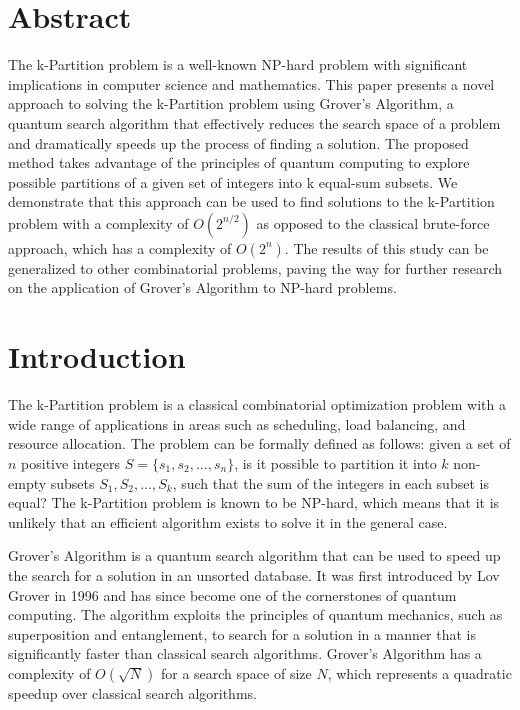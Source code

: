 \section{Abstract}

The k-Partition problem is a well-known NP-hard problem with significant implications in computer science and mathematics. This paper presents a novel approach to solving the k-Partition problem using Grover's Algorithm, a quantum search algorithm that effectively reduces the search space of a problem and dramatically speeds up the process of finding a solution. The proposed method takes advantage of the principles of quantum computing to explore possible partitions of a given set of integers into k equal-sum subsets. We demonstrate that this approach can be used to find solutions to the k-Partition problem with a complexity of $O(2^{n/2})$ as opposed to the classical brute-force approach, which has a complexity of $O(2^n)$. The results of this study can be generalized to other combinatorial problems, paving the way for further research on the application of Grover's Algorithm to NP-hard problems.

\section{Introduction}

The k-Partition problem is a classical combinatorial optimization problem with a wide range of applications in areas such as scheduling, load balancing, and resource allocation. The problem can be formally defined as follows: given a set of $n$ positive integers $S = \{s_1, s_2, \dots, s_n\}$, is it possible to partition it into $k$ non-empty subsets $S_1, S_2, \dots, S_k$, such that the sum of the integers in each subset is equal? The k-Partition problem is known to be NP-hard, which means that it is unlikely that an efficient algorithm exists to solve it in the general case.

Grover's Algorithm is a quantum search algorithm that can be used to speed up the search for a solution in an unsorted database. It was first introduced by Lov Grover in 1996 and has since become one of the cornerstones of quantum computing. The algorithm exploits the principles of quantum mechanics, such as superposition and entanglement, to search for a solution in a manner that is significantly faster than classical search algorithms. Grover's Algorithm has a complexity of $O(\sqrt{N})$ for a search space of size $N$, which represents a quadratic speedup over classical search algorithms.

